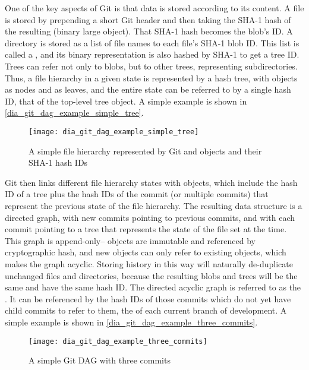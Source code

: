 One of the key aspects of Git is that data is stored according to its content. A
file is stored by prepending a short Git header and then taking the SHA-1 hash
of the resulting  (binary large object). That SHA-1 hash becomes
the blob's ID. A directory is stored as a list of file names to each file's
SHA-1 blob ID. This list is called a , and its binary
representation is also hashed by SHA-1 to get a tree ID. Trees can refer not
only to blobs, but to other trees, representing subdirectories. Thus, a file
hierarchy in a given state is represented by a hash tree, with 
objects as nodes and  as leaves, and the entire state can be
referred to by a single hash ID, that of the top-level tree object. A simple
example is shown in \autoref{dia_git_dag_example_simple_tree}.

\begin{figure}[h]
    \centering
    \texttt{[image: dia\_git\_dag\_example\_simple\_tree]}
    \caption{A simple file hierarchy represented by Git  and
         objects and their SHA-1 hash IDs}
    \label{dia_git_dag_example_simple_tree}
\end{figure}

Git then links different file hierarchy states with  objects,
which include the hash ID of a tree plus the hash IDs of the commit (or multiple
commits) that represent the previous state of the file hierarchy. The resulting
data structure is a directed graph, with new commits pointing to previous
commits, and with each commit pointing to a tree that represents the state of
the file set at the time. This graph is append-only-- objects are immutable and
referenced by cryptographic hash, and new objects can only refer to existing
objects, which makes the graph acyclic. Storing history in this way will
naturally de-duplicate unchanged files and directories, because the resulting
blobs and trees will be the same and have the same hash ID. The directed acyclic
graph is referred to as the . It can be referenced by the hash IDs
of those commits which do not yet have child commits to refer to them, the
 of each current branch of development. A simple example is shown
in \autoref{dia_git_dag_example_three_commits}.

\begin{figure}[h]
    \centering
    \texttt{[image: dia\_git\_dag\_example\_three\_commits]}
    \caption{A simple Git DAG with three commits}
    \label{dia_git_dag_example_three_commits}
\end{figure}

